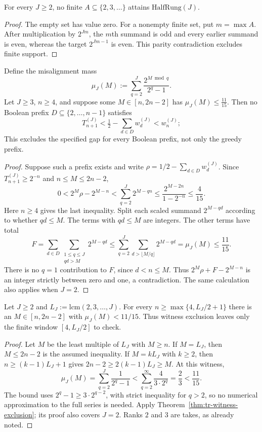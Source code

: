 \begin{lem}
\label{lem:tr-parity}
For every $J\ge2$, no finite $A\subseteq\{2,3,\ldots\}$ attains
$\mathrm{HalfRung}(J)$.
\end{lem}
\begin{proof}
The empty set has value zero.  For a nonempty finite set, put $m=\max A$.
After multiplication by $2^{Jm}$, the $m$th summand is odd and every earlier
summand is even, whereas the target $2^{Jm-1}$ is even.  This parity
contradiction excludes finite support.
\end{proof}

\begin{thm}
\label{thm:tr-witness-exclusion}
Define the misalignment mass
$$\mu_J(M):=\sum_{q=2}^{J}\frac{2^{M\bmod q}}{2^q-1}.$$
Let $J\ge3$, $n\ge4$, and suppose some $M\in[n,2n-2]$ has $\mu_J(M)\le\tfrac{11}{15}$. Then no
Boolean prefix $D\subseteq\{2,\ldots,n-1\}$ satisfies
$$T_{n+1}^{(J)}<\tfrac12-\sum_{d\in D}w_d^{(J)}<w_n^{(J)};$$
This excludes the specified gap for every Boolean prefix, not only the
greedy prefix.
\end{thm}
\begin{proof}
Suppose such a prefix exists and write
$\rho=1/2-\sum_{d\in D}w_d^{(J)}$.  Since
$T_{n+1}^{(J)}\ge2^{-n}$ and $n\le M\le2n-2$,
\[
 0<2^M\rho-2^{M-n}
   <\sum_{q=2}^{J}2^{M-qn}
   \le\frac{2^{M-2n}}{1-2^{-n}}\le\frac4{15}.
\]
Here $n\ge4$ gives the last inequality.  Split each scaled summand
$2^{M-qd}$ according to whether $qd\le M$.  The terms with
$qd\le M$ are integers.  The other terms have total
\[
 F=\sum_{d\in D}\sum_{\substack{1\le q\le J\\qd>M}}2^{M-qd}
 \le\sum_{q=2}^{J}\sum_{d>\lfloor M/q\rfloor}2^{M-qd}
 =\mu_J(M)\le\frac{11}{15}.
\]
There is no $q=1$ contribution to $F$, since $d<n\le M$.
Thus $2^M\rho+F-2^{M-n}$ is an integer strictly between zero and one,
a contradiction.  The same calculation also applies when $J=2$.
\end{proof}

\begin{cor}
\label{cor:tr-half-lcm}
Let $J\ge2$ and $L_J:=\mathrm{lcm}(2,3,\ldots,J)$.  For every
$n\ge\max\{4,L_J/2+1\}$ there is an $M\in[n,2n-2]$ with
$\mu_J(M)<11/15$.  Thus witness exclusion leaves only the finite
window $[4,L_J/2]$ to check.
\end{cor}
\begin{proof}
Let $M$ be the least multiple of $L_J$ with $M\ge n$.
If $M=L_J$, then $M\le2n-2$ is the assumed inequality.
If $M=kL_J$ with $k\ge2$, then $n\ge(k-1)L_J+1$ gives
$2n-2\ge2(k-1)L_J\ge M$.  At this witness,
\[
 \mu_J(M)=\sum_{q=2}^{J}\frac1{2^q-1}
 <\sum_{q=2}^{\infty}\frac{4}{3\cdot2^q}
 =\frac23<\frac{11}{15}.
\]
The bound uses $2^q-1\ge3\cdot2^{q-2}$, with strict inequality for
$q>2$, so no numerical approximation to the full series is needed.
Apply Theorem~\ref{thm:tr-witness-exclusion}; its proof also covers
$J=2$.  Ranks $2$ and $3$ are takes, as already noted.
\end{proof}

